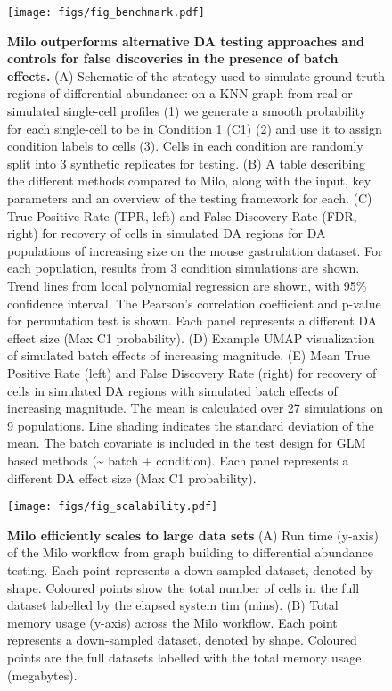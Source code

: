 \documentclass[
  10pt,
]{article}
\begin{document}
\begin{figure}
\centering
\texttt{[image: figs/fig\_benchmark.pdf]}
\caption{\label{fig:fig-2}\textbf{Milo outperforms alternative DA testing approaches and controls for false discoveries in the presence of batch effects.}
(A) Schematic of the strategy used to simulate ground truth regions of differential abundance: on a KNN graph from real or simulated single-cell profiles (1) we generate a smooth probability for each single-cell to be in Condition 1 (C1) (2) and use it to assign condition labels to cells (3). Cells in each condition are randomly split into 3 synthetic replicates for testing.
(B) A table describing the different methods compared to Milo, along with the input, key parameters and an overview of the testing framework for each.
(C) True Positive Rate (TPR, left) and False Discovery Rate (FDR, right) for recovery of cells in simulated DA regions for DA populations of increasing size on the mouse gastrulation dataset. For each population, results from 3 condition simulations are shown. Trend lines from local polynomial regression are shown, with 95\% confidence interval. The Pearson's correlation coefficient and p-value for permutation test is shown. Each panel represents a different DA effect size (Max C1 probability).
(D) Example UMAP visualization of simulated batch effects of increasing magnitude.
(E) Mean True Positive Rate (left) and False Discovery Rate (right) for recovery of cells in simulated DA regions with simulated batch effects of increasing magnitude. The mean is calculated over 27 simulations on 9 populations. Line shading indicates the standard deviation of the mean. The batch covariate is included in the test design for GLM based methods (\textasciitilde{} batch + condition). Each panel represents a different DA effect size (Max C1 probability).}
\end{figure}








\begin{figure}
\centering
\texttt{[image: figs/fig\_scalability.pdf]}
\caption{\label{fig:fig-3}\textbf{Milo efficiently scales to large data sets}
(A) Run time (y-axis) of the Milo workflow from graph building to differential abundance testing. Each point represents a down-sampled dataset, denoted by shape. Coloured points show the total number of cells in the full dataset labelled by the elapsed system tim (mins).
(B) Total memory usage (y-axis) across the Milo workflow. Each point represents a down-sampled dataset, denoted by shape. Coloured points are the full datasets labelled with the total memory usage (megabytes).}
\end{figure}
\end{document}
